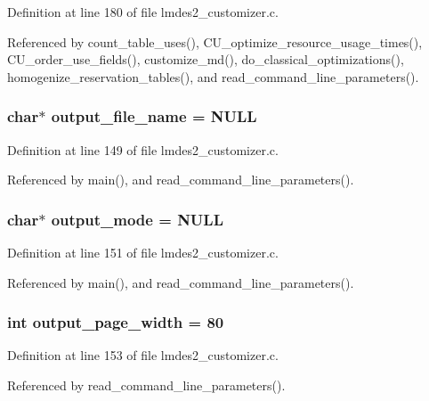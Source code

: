 Definition at line 180 of file lmdes2\_\-customizer.c.

Referenced by count\_\-table\_\-uses(), CU\_\-optimize\_\-resource\_\-usage\_\-times(), CU\_\-order\_\-use\_\-fields(), customize\_\-md(), do\_\-classical\_\-optimizations(), homogenize\_\-reservation\_\-tables(), and read\_\-command\_\-line\_\-parameters().
\subsubsection{\setlength{\rightskip}{0pt plus 5cm}char$\ast$ \bf{output\_\-file\_\-name} = \bf{NULL}}\label{lmdes2__customizer_8c_cdcd0d11bb729145f180d52a0755cddf}




Definition at line 149 of file lmdes2\_\-customizer.c.

Referenced by main(), and read\_\-command\_\-line\_\-parameters().
\subsubsection{\setlength{\rightskip}{0pt plus 5cm}char$\ast$ \bf{output\_\-mode} = \bf{NULL}}\label{lmdes2__customizer_8c_14a61661c70b91f945e8456ead9fb6c1}




Definition at line 151 of file lmdes2\_\-customizer.c.

Referenced by main(), and read\_\-command\_\-line\_\-parameters().
\subsubsection{\setlength{\rightskip}{0pt plus 5cm}int \bf{output\_\-page\_\-width} = 80}\label{lmdes2__customizer_8c_bbe586720dc5d6766839fbdc260002c1}




Definition at line 153 of file lmdes2\_\-customizer.c.

Referenced by read\_\-command\_\-line\_\-parameters().
